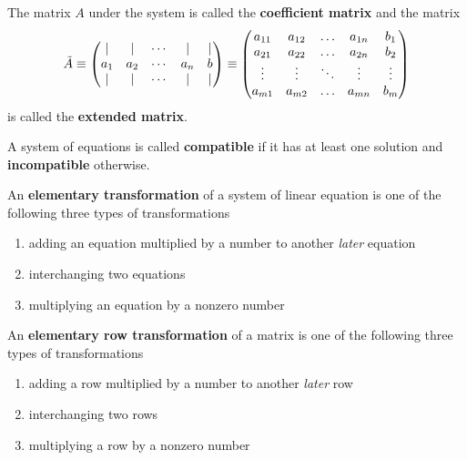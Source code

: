   \begin{definition}
    The matrix $A$ under the system is called the \textbf{coefficient matrix} and the matrix 
    \begin{equation}
      \Tilde{A} \equiv \begin{pmatrix}
      | & | & \cdots & | & | \\
      a_1 & a_2 & \cdots & a_n & b \\
      | & | & \cdots & | & | 
      \end{pmatrix} \equiv \begin{pmatrix}
      a_{1 1} & a_{1 2} & \ldots& a_{1 n} & b_1\\
       a_{2 1} & a_{2 2} & \ldots & a_{2 n} & b_2\\
      \vdots & \vdots & \ddots & \vdots & \vdots\\
       a_{m 1} & a_{m 2} & \ldots & a_{m n} & b_m
      \end{pmatrix}
    \end{equation}
    is called the \textbf{extended matrix}. 
  \end{definition}

  \begin{definition}
    A system of equations is called \textbf{compatible} if it has at least one solution and \textbf{incompatible} otherwise. 
  \end{definition}

  \begin{definition}
    An \textbf{elementary transformation} of a system of linear equation is one of the following three types of transformations
    \begin{enumerate}
      \item adding an equation multiplied by a number to another \textit{later} equation
      \item interchanging two equations
      \item multiplying an equation by a nonzero number
    \end{enumerate}
  \end{definition}

  \begin{definition}
    An \textbf{elementary row transformation} of a matrix is one of the following three types of transformations
    \begin{enumerate}
      \item adding a row multiplied by a number to another \textit{later} row
      \item interchanging two rows
      \item multiplying a row by a nonzero number
    \end{enumerate}
  \end{definition}

